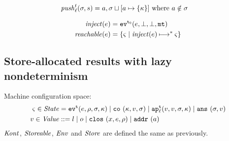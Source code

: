 \documentclass{llncs}
\newcommand{\alt}{\mid}
\begin{document}
\begin{align*}
\push_\mlab^\mcntr(\msto,\mstor) &= \maddr,\msto\sqcup[\maddr\mapsto\{\mkont\}]
\mbox{ where }\maddr \notin\msto
\end{align*}

\begin{align*}
\inject(\mexp) &= \ev[^\mtcntr]{\mexp,\bot,\bot,\kmt} \\
\reachable{\mexp} &= \setof{\mstate \mid \inject(\mexp) \machstep^* \mstate}
\end{align*}

\subsection{Store-allocated results with lazy nondeterminism}

Machine configuration space:
\begin{align*}
\mstate \in \State &= \ev[^\mcntr]{\mexp, \menv, \msto, \mkont} \alt
                     \co{\mkont, \mval, \msto} \alt
                     \ap[_\mlab^\mcntr]{\mval,\mval,\msto,\mkont} \alt
                     \ans{\msto,\mval}\\
\mval \in \Value &::= \mlit \alt \mop \alt
                      \clos{\mvar,\mexp,\menv} \alt
                      \spchoice{\saddr\maddr}{\superposition{\mval{s}}}
\end{align*}
$\Kont$, $\Storeable$, $\Env$ and $\Store$ are defined the same as previously.
\end{document}
